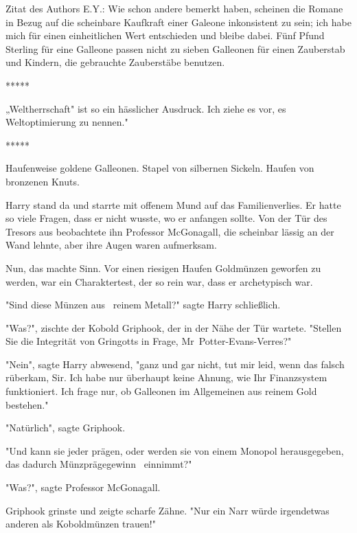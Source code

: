 

\hypertarget{die-hypothese-des-effizienten-marktes}{%

Zitat des Authors E.Y.: Wie schon andere bemerkt haben, scheinen die Romane in Bezug auf die scheinbare Kaufkraft einer Galeone inkonsistent zu sein; ich habe mich für einen einheitlichen Wert entschieden und bleibe dabei. Fünf Pfund Sterling für eine Galleone passen nicht zu sieben Galleonen für einen Zauberstab und Kindern, die gebrauchte Zauberstäbe benutzen. ~

*****

„Weltherrschaft" ist so ein hässlicher Ausdruck. Ich ziehe es vor, es Weltoptimierung zu nennen." ~

*****

Haufenweise goldene Galleonen. Stapel von silbernen Sickeln. Haufen von bronzenen Knuts.

Harry stand da und starrte mit offenem Mund auf das Familienverlies. Er hatte so viele Fragen, dass er nicht wusste, wo er anfangen sollte. Von der Tür des Tresors aus beobachtete ihn Professor McGonagall, die scheinbar lässig an der Wand lehnte, aber ihre Augen waren aufmerksam.

Nun, das machte Sinn. Vor einen riesigen Haufen Goldmünzen geworfen zu werden, war ein Charaktertest, der so rein war, dass er archetypisch war.

"Sind diese Münzen aus ~reinem Metall?" sagte Harry schließlich.

"Was?", zischte der Kobold Griphook, der in der Nähe der Tür wartete. "Stellen Sie die Integrität von Gringotts in Frage, Mr~Potter-Evans-Verres?"

"Nein", sagte Harry abwesend, "ganz und gar nicht, tut mir leid, wenn das falsch rüberkam, Sir. Ich habe nur überhaupt keine Ahnung, wie Ihr Finanzsystem funktioniert. Ich frage nur, ob Galleonen im Allgemeinen aus reinem Gold bestehen."

"Natürlich", sagte Griphook.

"Und kann sie jeder prägen, oder werden sie von einem Monopol herausgegeben, das dadurch Münzprägegewinn ~einnimmt?"

"Was?", sagte Professor McGonagall.

Griphook grinste und zeigte scharfe Zähne. "Nur ein Narr würde irgendetwas anderen als Koboldmünzen trauen!"

}
